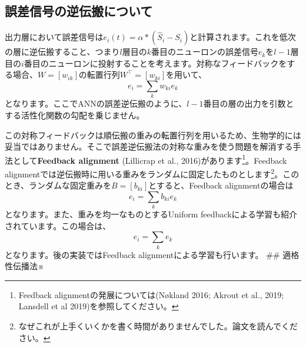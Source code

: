 \subsection{誤差信号の逆伝搬について}
出力層において誤差信号は$e_i(t)=\alpha * \left(\hat{S}_{i}-S_{i}\right)$と計算されます。これを低次の層に逆伝搬すること、つまり$l$層目の$k$番目のニューロンの誤差信号$e_k$を$l-1$層目の$i$番目のニューロンに投射することを考えます。対称なフィードバックをする場合、$W=[w_{ik}]$の転置行列$W^\intercal=[w_{ki}]$を用いて、
\begin{equation}
e_i=\sum_k w_{ki} e_k
\end{equation}
となります。ここでANNの誤差逆伝搬のように、$l-1$番目の層の出力を引数とする活性化関数の勾配を乗じません。\par
この対称フィードバックは順伝搬の重みの転置行列を用いるため、生物学的には妥当ではありません。そこで誤差逆伝搬法の対称な重みを使う問題を解消する手法として\textbf{Feedback alignment} (Lillicrap et al., 2016)があります\footnote{Feedback alignmentの発展については(Nøkland 2016; Akrout et al., 2019; Lansdell et al 2019)を参照してください。}。Feedback alignmentでは逆伝搬時に用いる重みをランダムに固定したものとします\footnote{なぜこれが上手くいくかを書く時間がありませんでした。論文を読んでください。}。このとき、ランダムな固定重みを$B=[b_{ki}]$とすると、Feedback alignmentの場合は
\begin{equation}
e_i=\sum_k b_{ki} e_k
\end{equation}
となります。また、重みを均一なものとするUniform feedbackによる学習も紹介されています。この場合は、
\begin{equation}
e_i=\sum_k e_k
\end{equation}
となります。後の実装ではFeedback alignmentによる学習も行います。
## 適格性伝播法※
